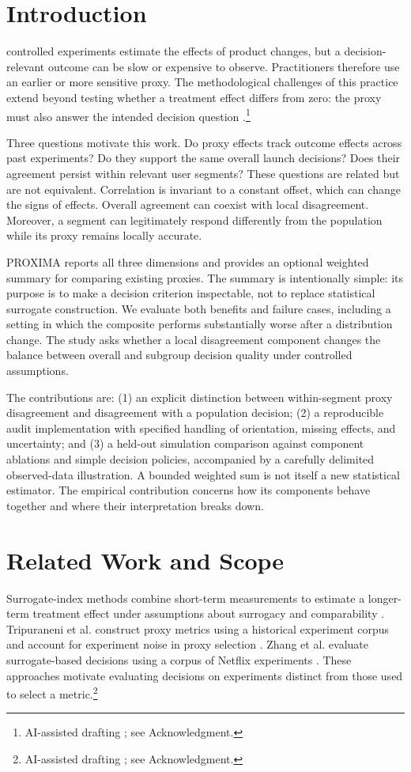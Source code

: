 \documentclass{ieeeaccess}
\begin{document}
\section{Introduction}
 controlled experiments estimate the effects of product changes, but a decision-relevant outcome can be slow or expensive to observe. Practitioners therefore use an earlier or more sensitive proxy. The methodological challenges of this practice extend beyond testing whether a treatment effect differs from zero: the proxy must also answer the intended decision question \cite{kohavi,larsen}.\footnote{AI-assisted drafting \cite{codex}; see Acknowledgment.}

Three questions motivate this work. Do proxy effects track outcome effects across past experiments? Do they support the same overall launch decisions? Does their agreement persist within relevant user segments? These questions are related but are not equivalent. Correlation is invariant to a constant offset, which can change the signs of effects. Overall agreement can coexist with local disagreement. Moreover, a segment can legitimately respond differently from the population while its proxy remains locally accurate.

PROXIMA reports all three dimensions and provides an optional weighted summary for comparing existing proxies. The summary is intentionally simple: its purpose is to make a decision criterion inspectable, not to replace statistical surrogate construction. We evaluate both benefits and failure cases, including a setting in which the composite performs substantially worse after a distribution change. The study asks whether a local disagreement component changes the balance between overall and subgroup decision quality under controlled assumptions.

The contributions are: (1) an explicit distinction between within-segment proxy disagreement and disagreement with a population decision; (2) a reproducible audit implementation with specified handling of orientation, missing effects, and uncertainty; and (3) a held-out simulation comparison against component ablations and simple decision policies, accompanied by a carefully delimited observed-data illustration. A bounded weighted sum is not itself a new statistical estimator. The empirical contribution concerns how its components behave together and where their interpretation breaks down.

\section{Related Work and Scope}
Surrogate-index methods combine short-term measurements to estimate a longer-term treatment effect under assumptions about surrogacy and comparability \cite{athey}. Tripuraneni et al. construct proxy metrics using a historical experiment corpus and account for experiment noise in proxy selection \cite{tripuraneni}. Zhang et al. evaluate surrogate-based decisions using a corpus of Netflix experiments \cite{zhang}. These approaches motivate evaluating decisions on experiments distinct from those used to select a metric.\footnote{AI-assisted drafting \cite{codex}; see Acknowledgment.}
\end{document}
